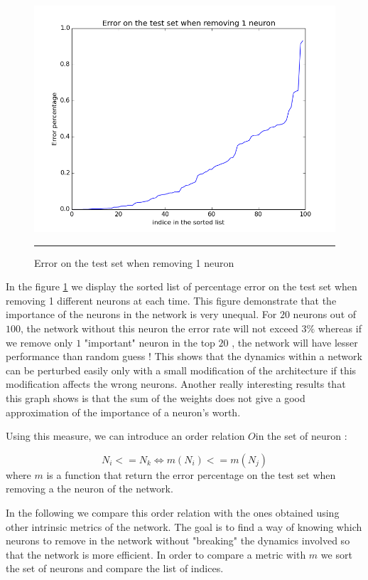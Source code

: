 \begin{figure}[htbp]
    \centering
    \includegraphics[scale=0.8]{Figures/error_test_set_remove_neuron.png}
    \rule{35em}{0.5pt}
    \caption[Error on the test set when removing 1 neuron]{Error on the test set when removing 1 neuron}
    \label{fig:error_one_neuron}
\end{figure}

In the figure \ref{fig:error_one_neuron} we display the sorted list of percentage error on the test set when removing 1 different neurons at each time. This figure demonstrate that the importance of the neurons in the network is very unequal. For $20$ neurons out of $100$, the network without this neuron the error rate will not exceed $3\%$ whereas if we remove only $1$ "important" neuron in the top $20$ , the network will have lesser performance than random guess ! This shows that the dynamics within a network can be perturbed easily only with a small modification of the architecture if this modification affects the wrong neurons. Another really interesting results that this graph shows is that the sum of the weights does not give a good approximation of the importance of a neuron's worth.

Using this measure, we can introduce an order relation $O$in the set of neuron : 

$$ N_i <= N_k \Leftrightarrow m(N_i) <= m(N_j) $$ where $m$ is a function that return the error percentage on the test set when removing a the neuron of the network.

In the following we compare this order relation with the ones obtained using other intrinsic metrics of the network. The goal is to find a way of knowing which neurons to remove in the network without "breaking" the dynamics involved so that the network is more efficient. In order to compare a metric with $m$ we sort the set of neurons and compare the list of indices. 

